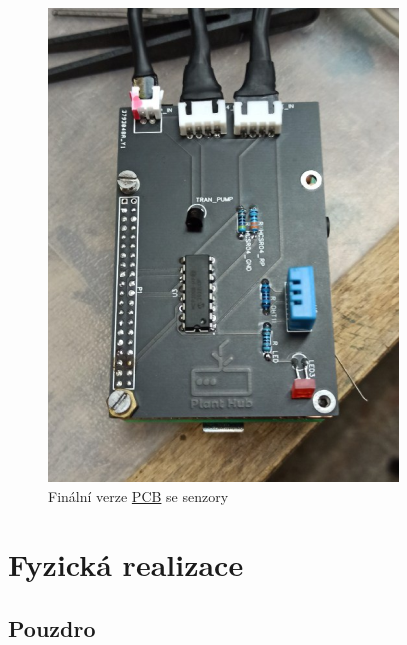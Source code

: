\documentclass[czech,12pt,a4paper]{article}
\begin{document}
\begin{figure}[h]
\begin{minipage}[t]{0.5\linewidth}
		\includegraphics[width=\linewidth]{pcb.png}
		\caption{Finální verze \underline{\ac{PCB}} se senzory}
		\label{fig:finalni-verze}
	\end{minipage}
\end{figure}

\clearpage

\section{Fyzická realizace}


\subsection{Pouzdro}
\end{document}
